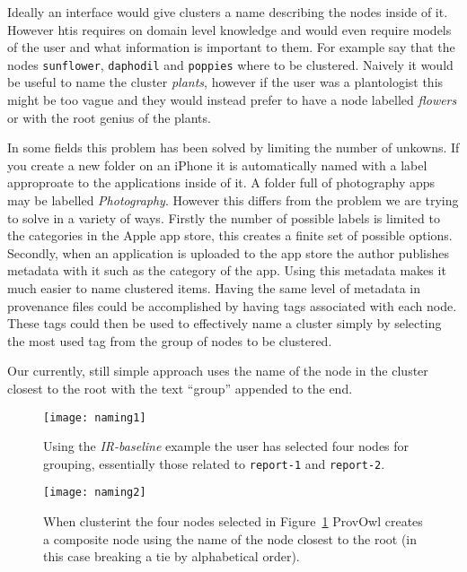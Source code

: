 Ideally an interface would give clusters a name describing the nodes inside of it. However htis requires on domain level knowledge and would even require models of the user and what information is important to them. For example say that the nodes \texttt{sunflower}, \texttt{daphodil} and \texttt{poppies} where to be clustered. Naively it would be useful to name the cluster \textit{plants}, however if the user was a plantologist
this might be too vague and they would instead prefer to have a node labelled \textit{flowers} or with the root genius of the plants. 

In some fields this problem has been solved by limiting the number of unkowns. If you create a new folder on an iPhone it is automatically named with a label approproate to the applications inside of it. A folder full of photography apps may be labelled \textit{Photography}. However this differs from the problem we are trying to solve in a variety of ways. Firstly the number of possible labels is limited to the categories in the Apple app store, this creates a finite set of possible options. Secondly, when an application is uploaded to the app store the author publishes metadata with it such as the category of the app. Using this metadata makes it much easier to name clustered items. Having the same level of metadata in provenance files could be accomplished by having tags associated with each node. These tags could then be used to effectively name a cluster simply by selecting the most used tag from the group of nodes to be clustered.

Our currently, still simple approach uses the name of the node in the cluster closest to the root with the text ``group'' appended to the end.

\begin{figure}[h]
	\centering
	\texttt{[image: naming1]}
	\caption{Using the \textit{IR-baseline} example the user has selected four nodes for grouping, essentially those related to \texttt{report-1} and \texttt{report-2}.}
	\label{fig:naming1}
\end{figure}
\begin{figure}[h]
	\centering
	\texttt{[image: naming2]}
	\caption{When clusterint the four nodes selected in Figure~\ref{fig:naming1} ProvOwl creates a composite node using the name of the node closest to the root (in this case breaking a tie by alphabetical order).}
	\label{fig:naming2}
\end{figure}
\clearpage

